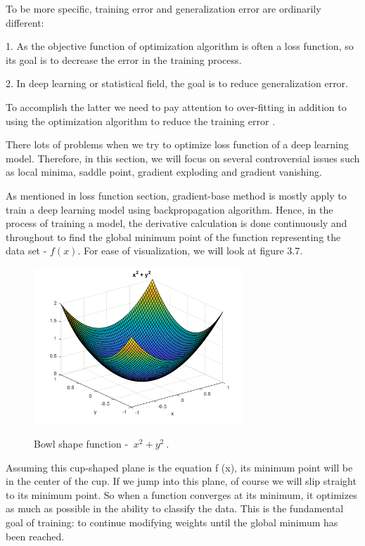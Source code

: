 	To be more specific, training error and generalization error are ordinarily different:

	1. As the objective function of optimization algorithm is often a loss function, so its goal is to decrease the error in the training process.

	2. In deep learning or statistical field, the goal is to reduce generalization error.

	To accomplish the latter we need to pay attention to over-fitting in addition to using the optimization algorithm to reduce the training error \cite{dive2dl}.
	
	There lots of problems when we try to optimize loss function of a deep learning model. Therefore, in this section, we will focus on several controversial issues such as local minima, saddle point, gradient exploding and gradient vanishing.
	
	As mentioned in loss function section, gradient-base method is mostly apply to train a deep learning model using backpropagation algorithm. Hence, in the process of training a model, the derivative calculation is done continuously and throughout to find the global minimum point of the function representing the data set - $ f (x) $. For ease of visualization, we will look at figure 3.7.
	
	\begin{figure}[H]
		\centering
		{\includegraphics[width=0.7\textwidth]{./hinhanh/chap3/bowl_shape.png}}
		\caption[bowl]{Bowl shape function - $ \ {x^2} + {y^2} \ $.}
	\end{figure}
	
	Assuming this cup-shaped plane is the equation f (x), its minimum point will be in the center of the cup. If we jump into this plane, of course we will slip straight to its minimum point. So when a function converges at its minimum, it optimizes as much as possible in the ability to classify the data. This is the fundamental goal of training: to continue modifying weights until the global minimum has been reached.
	
